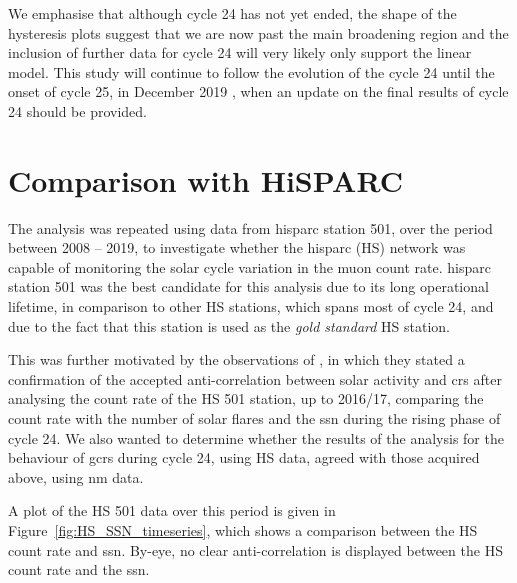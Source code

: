 We emphasise that although cycle 24 has not yet ended, the shape of the hysteresis plots suggest that we are now past the main broadening region and the inclusion of further data for cycle 24 will very likely only support the linear model. This study will continue to follow the evolution of the cycle 24 until the onset of cycle 25, in December 2019 \citep{howe_signatures_2018, upton_updated_2018, pesnell_early_2018}, when an update on the final results of cycle 24 should be provided.







\section{Comparison with HiSPARC}\label{sec:HS_vs_SSN}

The analysis was repeated using data from \gls{hisparc} station 501, over the period between 2008 -- 2019, to investigate whether the \gls{hisparc} (HS) network was capable of monitoring the solar cycle variation in the muon count rate. \gls{hisparc} station 501 was the best candidate for this analysis due to its long operational lifetime, in comparison to other HS stations, which spans most of cycle 24, and due to the fact that this station is used as the {\it gold standard} HS station. 

This was further motivated by the observations of \citet{fan_analysis_2018}, in which they stated a confirmation of the accepted anti-correlation between solar activity and \glspl{cr} after analysing the count rate of the HS 501 station, up to 2016/17, comparing the count rate with the number of solar flares and the \gls{ssn} during the rising phase of cycle 24. We also wanted to determine whether the results of the analysis for the behaviour of \glspl{gcr} during cycle 24, using HS data, agreed with those acquired above, using \gls{nm} data.

A plot of the HS 501 data over this period is given in Figure~\ref{fig:HS_SSN_timeseries}, which shows a comparison between the HS count rate and \gls{ssn}. By-eye, no clear anti-correlation is displayed between the HS count rate and the \gls{ssn}.


